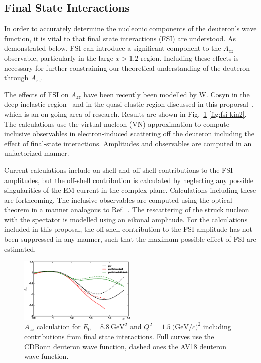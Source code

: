 
\subsection{Final State Interactions}

In order to accurately determine the nucleonic components of the deuteron's wave function, it is vital to that final state interactions (FSI) are understood. As demonstrated below, FSI can introduce a significant component to the $A_{zz}$ observable, particularly in the large $x>1.2$ region. Including these effects is necessary for further constraining our theoretical understanding of the deuteron through $A_{zz}$.

The effects of FSI on $A_{zz}$ have been recently been modelled by W. Cosyn in the deep-inelastic region~\cite{Cosyn:2014sqa} and in the quasi-elastic region discussed in this proporsal~\cite{cosyn-convo}, which is an on-going area of research. Results are shown in Fig.~\ref{fig:fsi-kin1}-\ref{fig:fsi-kin2}. The calculations use the virtual nucleon (VN) approximation to compute inclusive observables in electron-induced scattering off the deuteron including the 
effect of final-state interactions. Amplitudes and observables are computed in an unfactorized manner.   

Current calculations include on-shell and off-shell contributions to the FSI amplitudes, but the off-shell contribution is calculated 	by neglecting any  possible singularities of the EM current in the complex plane.  Calculations 
including these are forthcoming.  The inclusive observables are computed using 
the optical theorem in a manner analogous to Ref.~\cite{Cosyn:2013uoa}.  The 
rescattering of the struck nucleon with the spectator is modelled using an 
eikonal amplitude.  For the calculations included in this proposal, the off-shell 
contribution to the FSI amplitude has not been suppressed in any manner, such that the maximum possible effect of FSI are estimated.

\begin{figure}[htb]
\begin{center}
  \includegraphics[width=0.5\textwidth]{figs/kin1_cdbonn_av18.eps}
\caption{$A_{zz}$ calculation for $E_0=8.8\mathrm{~GeV}^2$ and $Q^2=1.5\mathrm{~(GeV/}c)^2$ including contributions from final state interactions.  
Full curves use the CDBonn deuteron wave function, dashed ones the AV18 
deuteron wave function.}
\label{fig:fsi-kin1}       %
\end{center}
\end{figure}

